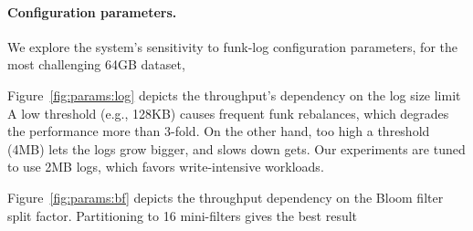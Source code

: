 \paragraph{Configuration parameters.} 
We explore the system's  sensitivity to funk-log configuration parameters, for the most challenging 64GB dataset, 
{}

Figure~\ref{fig:params:log} depicts the throughput's dependency on the log size limit {}
A low threshold (e.g., 128KB) causes frequent funk rebalances, which degrades the performance more than 3-fold. 
On the other hand, too high a threshold (4MB) lets the logs grow bigger, and slows down gets. Our experiments are 
tuned to use 2MB logs, which favors write-intensive workloads. {}

Figure~\ref{fig:params:bf} depicts the throughput dependency on the Bloom filter split factor. 
Partitioning to 16 mini-filters gives the best result{}  